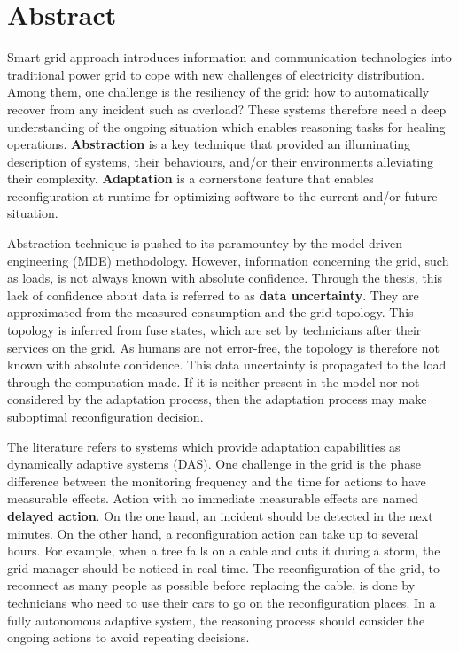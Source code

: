 \chapter*{Abstract}

\bigskip

Smart grid approach introduces information and communication technologies into traditional power grid to cope with new challenges of electricity distribution.
Among them, one challenge is the resiliency of the grid: how to automatically recover from any incident such as overload?
These systems therefore need a deep understanding of the ongoing situation which enables reasoning tasks for healing operations.
\textbf{Abstraction} is a key technique that provided an illuminating description of systems, their behaviours, and/or their environments alleviating their complexity.
\textbf{Adaptation} is a cornerstone feature that enables reconfiguration at runtime for optimizing software to the current and/or future situation.

Abstraction technique is pushed to its paramountcy by the model-driven engineering (MDE) methodology.
However, information concerning the grid, such as loads, is not always known with absolute confidence.
Through the thesis, this lack of confidence about data is referred to as \textbf{data uncertainty}.
They are approximated from the measured consumption and the grid topology.
This topology is inferred from fuse states, which are set by technicians after their services on the grid.
As humans are not error-free, the topology is therefore not known with absolute confidence.
This data uncertainty is propagated to the load through the computation made.
If it is neither present in the model nor not considered by the adaptation process, then the adaptation process may make suboptimal reconfiguration decision.

The literature refers to systems which provide adaptation capabilities as dynamically adaptive systems (DAS).
One challenge in the grid is the phase difference between the monitoring frequency and the time for actions to have measurable effects.
Action with no immediate measurable effects are named \textbf{delayed action}.
On the one hand, an incident should be detected in the next minutes.
On the other hand, a reconfiguration action can take up to several hours.
For example, when a tree falls on a cable and cuts it during a storm, the grid manager should be noticed in real time.
The reconfiguration of the grid, to reconnect as many people as possible before replacing the cable, is done by technicians who need to use their cars to go on the reconfiguration places.
In a fully autonomous adaptive system, the reasoning process should consider the ongoing actions to avoid repeating decisions.

